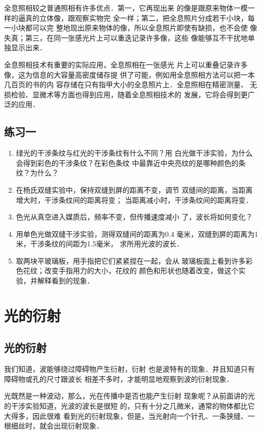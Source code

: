 全息照相较之普通照相有许多优点．第一，它再现出来
的像是跟原来物体一模一样的逼真的立体像，跟观察实物完
全一样；第二，把全息照片分成若干小块，每一小块都可以完
整地现出原来物体的像，所以全息照片即使有缺损，也不会使
像失真；第三，在同一张感光片上可以重迭记录许多像，这些
像能够互不干扰地单独显示出来．

全息照相技术有重要的实际应用，全息照相在一张感光
片上可以重叠记录许多像，这为信息的大容量高密度储存提
供了可能，例如用全息照相方法可以把一本几百页的书的内
容存储在只有指甲大小的全息照片上．全息照相在精密测量、
无损检验、显微术等方面也得到应用，随着全息照相技术的
发展，它将会得到更广泛的应用．

\subsection*{练习一}

\begin{enumerate}
\item 绿光的干涉条纹与红光的干涉条纹有什么不同？用
白光做干涉实验，为什么会得到彩色的干涉条纹？在彩色条纹
中最靠近中央亮纹的是哪种颜色的条纹？为什么？
\item 在杨氏双缝实验中，保持双缝到屏的距离不变，调节
双缝间的距离，当距离增大时，干涉条纹间的距离将变\underline{\qquad}；
当距离减小时，干涉条纹间的距离将变\underline{\qquad}．
\item 色光从真空进入媒质后，频率不变，但传播速度减小
了，波长将如何变化？
\item 用单色光做双缝干涉实验，测得双缝间的距离为0.4
毫米，双缝到屏的距离为1米，干涉条纹的间距为1.5毫米，
求所用光波的波长．
\item 取两块平玻璃板，用手指把它们紧紧捏在一起，会从
玻璃板面上看到许多彩色花纹；改变手指用力的大小，花纹的
颜色和形状也随着改变，做这个实验，并解释看到的现象．
\end{enumerate}

\section{光的衍射}
\subsection{光的衍射}

我们知道，波能够绕过障碍物产生衍射，衍射
也是波特有的现象．并且知道只有障碍物或孔的尺寸跟波长
相差不多时，才能明显地观察到波的衍射现象．

光既然是一种波动，那么，光在传播中是否也能产生衍射
现象呢？从前面讲的光的干涉实验知道，光波的波长是很短
的，只有十分之几微米，通常的物体都比它大得多，因此很难
看到光的衍射现象，但是，当光射向一个针孔、一条狭缝、一
根细丝时，就会出现衍射现象．


